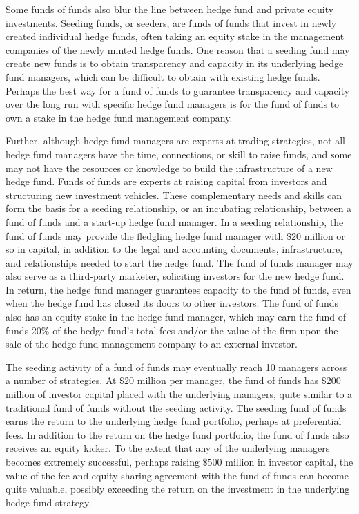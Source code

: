 \documentclass[11pt]{article}
\begin{document}
Some funds of funds also blur the line between hedge fund and private equity investments. Seeding funds, or seeders, are funds of funds that invest in newly created individual hedge funds, often taking an equity stake in the management companies of the newly minted hedge funds. One reason that a seeding fund may create new funds is to obtain transparency and capacity in its underlying hedge fund managers, which can be difficult to obtain with existing hedge funds. Perhaps the best way for a fund of funds to guarantee transparency and capacity over the long run with specific hedge fund managers is for the fund of funds to own a stake in the hedge fund management company.

Further, although hedge fund managers are experts at trading strategies, not all hedge fund managers have the time, connections, or skill to raise funds, and some may not have the resources or knowledge to build the infrastructure of a new hedge fund. Funds of funds are experts at raising capital from investors and structuring new investment vehicles. These complementary needs and skills can form the basis for a seeding relationship, or an incubating relationship, between a fund of funds and a start-up hedge fund manager. In a seeding relationship, the fund of funds may provide the fledgling hedge fund manager with $\$ 20$ million or so in capital, in addition to the legal and accounting documents, infrastructure, and relationships needed to start the hedge fund. The fund of funds manager may also serve as a third-party marketer, soliciting investors for the new hedge fund. In return, the hedge fund manager guarantees capacity to the fund of funds, even when the hedge fund has closed its doors to other investors. The fund of funds also has an equity stake in the hedge fund manager, which may earn the fund of funds $20 \%$ of the hedge fund's total fees and/or the value of the firm upon the sale of the hedge fund management company to an external investor.

The seeding activity of a fund of funds may eventually reach 10 managers across a number of strategies. At $\$ 20$ million per manager, the fund of funds has $\$ 200$ million of investor capital placed with the underlying managers, quite similar to a traditional fund of funds without the seeding activity. The seeding fund of funds earns the return to the underlying hedge fund portfolio, perhaps at preferential fees. In addition to the return on the hedge fund portfolio, the fund of funds also receives an equity kicker. To the extent that any of the underlying managers becomes extremely successful, perhaps raising $\$ 500$ million in investor capital, the value of the fee and equity sharing agreement with the fund of funds can become quite valuable, possibly exceeding the return on the investment in the underlying hedge fund strategy.
\end{document}
